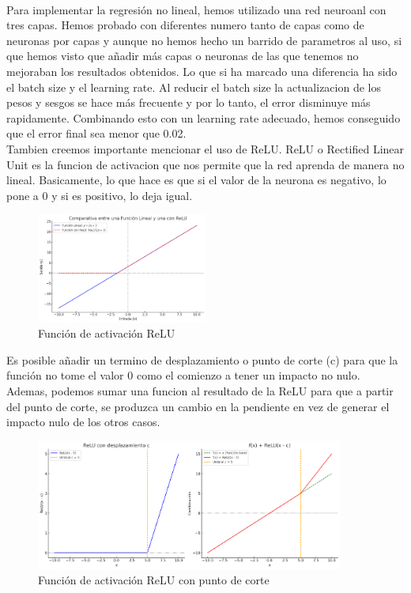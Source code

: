 \documentclass{report}
\begin{document}
        \paragraph*{}
        {
          Para implementar la regresión no lineal, hemos utilizado una red neuroanl con tres capas.
          Hemos probado con diferentes numero tanto de capas como de neuronas por capas y aunque no hemos hecho un barrido de parametros al uso, si que hemos visto que añadir más capas o neuronas de las que tenemos no mejoraban los resultados obtenidos.
          Lo que si ha marcado una diferencia ha sido el batch size y el learning rate. Al reducir el batch size la actualizacion de los pesos y sesgos se hace más frecuente y por lo tanto, el error disminuye más rapidamente. Combinando esto con un learning rate adecuado, hemos conseguido que el error final sea menor que 0.02.\\

          Tambien creemos importante mencionar el uso de ReLU.
          ReLU o Rectified Linear Unit es la funcion de activacion que nos permite que la red aprenda de manera no lineal.
          Basicamente, lo que hace es que si el valor de la neurona es negativo, lo pone a 0 y si es positivo, lo deja igual.
          
          \begin{figure}[H]
            \centering
            \includegraphics[width=0.5\textwidth]{.img/relu.png}
            \caption{Función de activación ReLU}
          \end{figure}

          Es posible añadir un termino de desplazamiento o punto de corte (c) para que la función no tome el valor 0 como el comienzo a tener un impacto no nulo.
          Ademas, podemos sumar una funcion al resultado de la ReLU para que a partir del punto de corte, se produzca un cambio en la pendiente en vez de generar el impacto nulo de los otros casos.
          
          \begin{figure}[H]
            \centering
            \includegraphics[width=0.9\textwidth]{.img/relu2.png}
            \caption{Función de activación ReLU con punto de corte}
          \end{figure}

}
\end{document}
